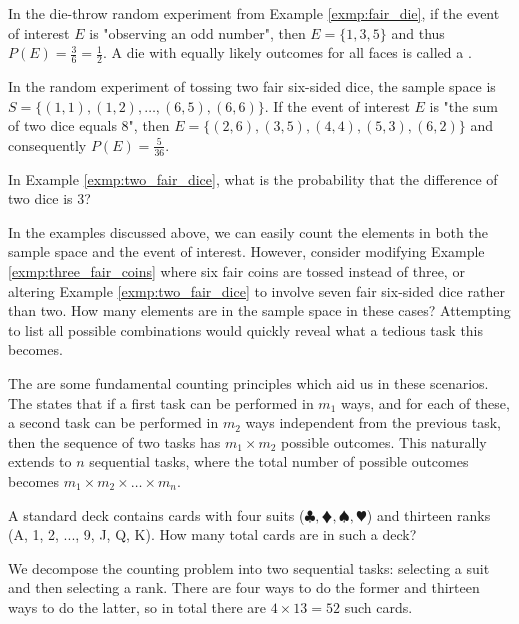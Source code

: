 \begin{exmp}
	In the die-throw random experiment from Example \autoref{exmp:fair_die}, if the event of interest \( E \) is "observing an odd number",
	then \( E = \{ 1, 3, 5 \} \) and thus \( P(E) = \frac{3}{6} = \frac{1}{2} \).
	A die with equally likely outcomes for all faces is called a .
\end{exmp}

\begin{exmp}\label{exmp:two_fair_dice}
	In the random experiment of tossing two fair six-sided dice, the sample space is
	\( S = \{ (1, 1), (1, 2), \ldots, (6, 5), (6, 6) \} \).
	If the event of interest \( E \) is "the sum of two dice equals 8",
	then \( E = \{ (2, 6), (3, 5), (4, 4), (5, 3), (6, 2) \} \) and consequently \( P(E) = \frac{5}{36} \).
\end{exmp}

\begin{ex}
	In Example \autoref{exmp:two_fair_dice}, what is the probability that the difference of two dice is 3?
\end{ex}

In the examples discussed above, we can easily count the elements in both the sample space and the event of interest.
However, consider modifying Example \autoref{exmp:three_fair_coins} where six fair coins are tossed instead of three,
or altering Example \autoref{exmp:two_fair_dice} to involve seven fair six-sided dice rather than two.
How many elements are in the sample space in these cases?
Attempting to list all possible combinations would quickly reveal what a tedious task this becomes.

The are some fundamental counting principles which aid us in these scenarios.
The  states that if a first task can be performed in \( m_1 \) ways,
and for each of these, a second task can be performed in \( m_2 \) ways independent from the previous task,
then the sequence of two tasks has \( m_1 \times m_2 \) possible outcomes.
This naturally extends to \( n \) sequential tasks,
where the total number of possible outcomes becomes \( m_1 \times m_2 \times \ldots \times m_n \).

\begin{exmp}
	A standard deck contains cards with four suits (\( \clubsuit, \vardiamondsuit, \spadesuit, \varheartsuit \)) and thirteen ranks (A, 1, 2, ..., 9, J, Q, K).
	How many total cards are in such a deck?
\end{exmp}
\begin{solution}
	We decompose the counting problem into two sequential tasks:
	selecting a suit and then selecting a rank.
	There are four ways to do the former and thirteen ways to do the latter, so in total there are \( 4 \times 13 = 52 \) such cards.
\end{solution}

